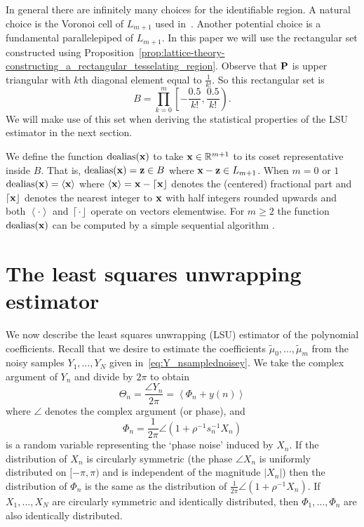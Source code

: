 \documentclass[aap,preprint]{imsart}
\newcommand{\reals}{{\mathbb R}}
\newcommand{\dealias}{\operatorname{dealias}}
\newcommand{\fracpart}[1]{\left\langle #1 \right\rangle}
\newcommand{\abs}[1]{\left\vert #1 \right\vert}
\newcommand{\round}[1]{{\left\lceil #1 \right\rfloor}}
\begin{document}
In general there are infinitely many choices for the identifiable region. A natural choice is the Voronoi cell of $L_{m+1}$ used in~\cite{McKilliam2009IndentifiabliltyAliasingPolyphase}. Another potential choice is a fundamental parallelepiped of $L_{m+1}$. In this paper we will use the rectangular set constructed using Proposition~\ref{prop:lattice-theory-constructing_a_rectangular_tesselating_region}. Observe that $\mathbf{P}$ is upper triangular with $k$th diagonal element equal to $\tfrac{1}{k!}$.  So this rectangular set is
\begin{equation}\label{eq:rectangular_identifiable_region}
B = \prod_{k=0}^{m}\left[ -\frac{0.5}{k!}, \frac{0.5}{k!}  \right).
\end{equation}
We will make use of this set when deriving the statistical properties of the LSU estimator in the next section. 

We define the function $\dealias(\xbf)$ to take $\xbf\in\reals^{m+1}$ to its coset representative inside $B$. That is, $\dealias(\xbf) = \zbf \in B$ where $\mathbf{x} - \mathbf{z} \in L_{m+1}$.  %
When $m = 0$ or $1$ $\dealias(\xbf) = \fracpart{\xbf}$ where $\fracpart{\xbf} = \xbf - \round{\xbf}$ denotes the (centered) fractional part and $\round{\xbf}$ denotes the nearest integer to $\mathbf{x}$ with half integers rounded upwards and both $\fracpart{\cdot}$ and $\round{\cdot}$ operate on vectors elementwise.  For $m \geq 2$ the function $\dealias(\xbf)$ can be computed by a simple sequential algorithm \cite[Sec. 7.2.1]{McKilliam2010thesis}.


\section{The least squares unwrapping estimator}\label{sec:least-squar-unwr}

We now describe the least squares unwrapping (LSU) estimator of the polynomial coefficients. Recall that we desire to estimate the coefficients $\tilde{\mu}_0, \dots, \tilde{\mu}_m$ from the noisy samples $Y_1, \dots, Y_N$ given in~\eqref{eq:Y_nsamplednoisey}.  We take the complex argument of $Y_n$ and divide by $2\pi$ to obtain
\begin{equation}\label{eq:noise_circ_poly}
\Theta_n = \frac{\angle{Y_n}}{2\pi} = \fracpart{ \Phi_n + y(n) }
\end{equation}
where $\angle$ denotes the complex argument (or phase), and 
\[
\Phi_n = \frac{1}{2\pi}\angle(1 + \rho^{-1}s_n^{-1}X_n)
\] 
is a random variable representing the `phase noise' induced by $X_n$.  If the distribution of $X_n$ is circularly symmetric (the phase $\angle X_n$ is uniformly distributed on $[-\pi, \pi)$ and is independent of the magnitude $\abs{X_n}$) then the distribution of $\Phi_n$ is the same as the distribution of $\tfrac{1}{2\pi}\angle(1 + \rho^{-1}X_n)$.  If $X_1, \dots, X_N$ are circularly symmetric and identically distributed, then $\Phi_1, \dots, \Phi_n$ are also identically distributed.
\end{document}
